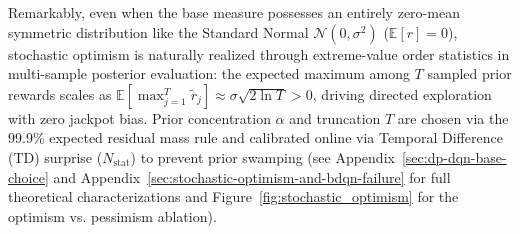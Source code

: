 \documentclass[10pt]{article}
\begin{document}
Remarkably, even when the base measure possesses an entirely zero-mean symmetric distribution like the Standard Normal $\mathcal{N}(0, \sigma^2)$ ($\mathbb{E}[r]=0$), stochastic optimism is naturally realized through extreme-value order statistics in multi-sample posterior evaluation: the expected maximum among $T$ sampled prior rewards scales as $\mathbb{E}[\max_{j=1}^T \tilde{r}_j] \approx \sigma \sqrt{2 \ln T} > 0$, driving directed exploration with zero jackpot bias. Prior concentration $\alpha$ and truncation $T$ are chosen via the 99.9\% expected residual mass rule and calibrated online via Temporal Difference (TD) surprise ($N_{\text{stat}}$) to prevent prior swamping (see Appendix~\ref{sec:dp-dqn-base-choice} and Appendix~\ref{sec:stochastic-optimism-and-bdqn-failure} for full theoretical characterizations and Figure~\ref{fig:stochastic_optimism} for the optimism vs. pessimism ablation).

\begin{table}[t]
\centering
\caption{Consolidated empirical evaluation across diverse decision-making and exploration benchmarks (mean $\pm$ standard error across seeds).}
\label{tab:empirical_summary}
\vskip 0.08in
\end{table}
\end{document}
